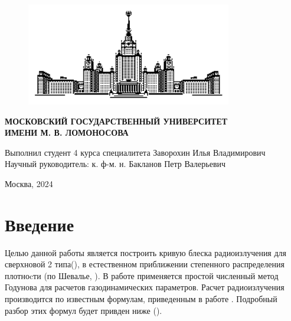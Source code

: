 \documentclass[a4paper,12pt]{article}
\begin{document}
\begin{titlepage} 
    \begin{figure}[!htb]
	\centering
	\includegraphics[width=0.8\textwidth]{Sketch_MSU.png}
	\label{fig:Sketch_MSU}
    \end{figure}
    \begin{center}
    \textbf{\Large  МОСКОВСКИЙ ГОСУДАРСТВЕННЫЙ УНИВЕРСИТЕТ \\
ИМЕНИ М. В. ЛОМОНОСОВА} 
    \end{center}
    \begin{center}
    \end{center}
    \begin{center}
    \end{center}
    \begin{center}
    \end{center}
    \begin{center}
    \end{center}
    \begin{center}
    \end{center}
    \vspace{4cm}
    \begin{flushright}
    Выполнил студент 4 курса специалитета Заворохин Илья Владимирович\\
    Научный руководитель: к. ф-м. н. Бакланов Петр Валерьевич
    \end{flushright}
    \vspace{1cm}
    \begin{center}
        Москва, 2024
    \end{center}
\end{titlepage} 


\date{\today}
\tableofcontents
\newpage

\section{Введение}
    Целью данной работы является построить кривую блеска радиоизлучения для сверхновой 2 типа(), в естественном приближении степенного распределения плотноcти (по Шевалье, \cite{Chevalier1982}). В работе применяется простой численный метод Годунова для расчетов газодинамических параметров. Расчет радиоизлучения производится по известным формулам, приведенным в работе \cite{Moriya2019Preprint}. Подробный разбор этих формул будет привден ниже ().
\end{document}
